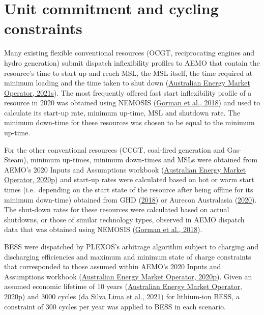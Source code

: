 \documentclass[12pt,a4paper,]{report}
\begin{document}
\hypertarget{unit-commitment-and-cycling-constraints}{%
\section{Unit commitment and cycling
constraints}\label{unit-commitment-and-cycling-constraints}}

Many existing flexible conventional resources (OCGT, reciprocating
engines and hydro generation) submit dispatch inflexibility profiles to
AEMO that contain the resource's time to start up and reach MSL, the MSL
itself, the time required at minimum loading and the time taken to shut
down
(\protect\hyperlink{ref-australianenergymarketoperatorFastStartInflexibilityProfile2021}{Australian
Energy Market Operator, 2021s}). The most frequently offered fast start
inflexibility profile of a resource in 2020 was obtained using NEMOSIS
(\protect\hyperlink{ref-gormanNEMOSISNEMOpen2018}{Gorman et al., 2018})
and used to calculate its start-up rate, minimum up-time, MSL and
shutdown rate. The minimum down-time for these resources was chosen to
be equal to the minimum up-time.

For the other conventional resources (CCGT, coal-fired generation and
Gas-Steam), minimum up-times, minimum down-times and MSLs were obtained
from AEMO's 2020 Inputs and Assumptions workbook
(\protect\hyperlink{ref-australianenergymarketoperator2020InputsAssumptions2020}{Australian
Energy Market Operator, 2020p}) and start-up rates were calculated based
on hot or warm start times (i.e.~depending on the start state of the
resource after being offline for its minimum down-time) obtained from
GHD (\protect\hyperlink{ref-ghd2018AEMOCost2018}{2018}) or Aurecon
Australasia
(\protect\hyperlink{ref-aureconaustralasiaGeneratorTechnicalCost2020}{2020}).
The shut-down rates for these resources were calculated based on actual
shutdowns, or those of similar technology types, observed in AEMO
dispatch data that was obtained using NEMOSIS
(\protect\hyperlink{ref-gormanNEMOSISNEMOpen2018}{Gorman et al., 2018}).

BESS were dispatched by PLEXOS's arbitrage algorithm subject to charging
and discharging efficiencies and maximum and minimum state of charge
constraints that corresponded to those assumed within AEMO's 2020 Inputs
and Assumptions workbook
(\protect\hyperlink{ref-australianenergymarketoperator2020InputsAssumptions2020}{Australian
Energy Market Operator, 2020p}). Given an assumed economic lifetime of
10 years
(\protect\hyperlink{ref-australianenergymarketoperator2020InputsAssumptions2020}{Australian
Energy Market Operator, 2020p}) and 3000 cycles
(\protect\hyperlink{ref-dasilvalimaLifeCycleAssessment2021}{da Silva
Lima et al., 2021}) for lithium-ion BESS, a constraint of 300 cycles per
year was applied to BESS in each scenario.
\end{document}
